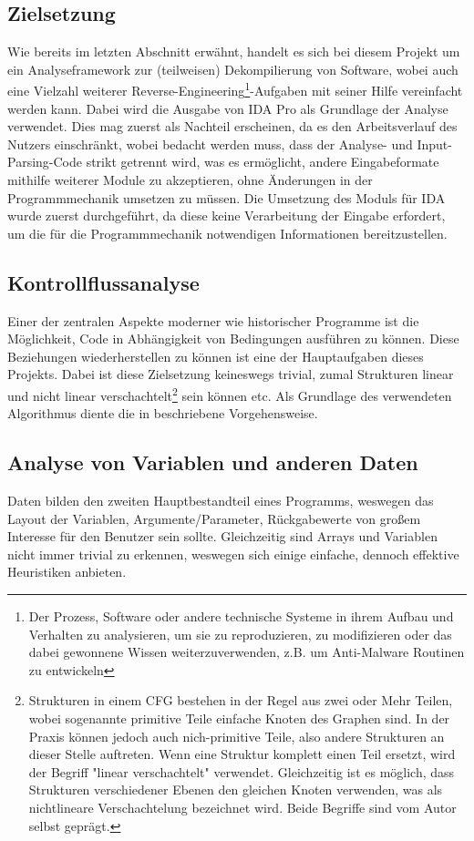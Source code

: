 \documentclass[11pt]{article} %
\begin{document}
\begin{multicols}{2}
\section{Zielsetzung}
Wie bereits im letzten Abschnitt erwähnt, handelt es sich bei diesem Projekt um ein Analyseframework zur (teilweisen) Dekompilierung von Software, wobei auch eine Vielzahl weiterer Reverse-Engineering\footnote{Der Prozess, Software oder andere technische Systeme in ihrem Aufbau und Verhalten zu analysieren, um sie zu reproduzieren, zu modifizieren oder das dabei gewonnene Wissen weiterzuverwenden, z.B. um Anti-Malware Routinen zu entwickeln}-Aufgaben mit seiner Hilfe vereinfacht werden kann. Dabei wird die Ausgabe von IDA Pro als Grundlage der Analyse verwendet. Dies mag zuerst als Nachteil erscheinen, da es den Arbeitsverlauf des Nutzers einschränkt, wobei bedacht werden muss, dass der Analyse- und Input-Parsing-Code strikt getrennt wird, was es ermöglicht, andere Eingabeformate mithilfe weiterer Module zu akzeptieren, ohne Änderungen in der Programmmechanik umsetzen zu müssen. Die Umsetzung des Moduls für IDA wurde zuerst durchgeführt, da diese keine Verarbeitung der Eingabe erfordert, um die für die Programmmechanik notwendigen Informationen bereitzustellen.

\subsection{Kontrollflussanalyse}
\label{sec:CFA}
Einer der zentralen Aspekte moderner wie historischer Programme ist die Möglichkeit, Code in Abhängigkeit von Bedingungen ausführen zu können. Diese Beziehungen wiederherstellen zu können ist eine der Hauptaufgaben dieses Projekts. Dabei ist diese Zielsetzung keineswegs trivial, zumal Strukturen linear und nicht linear verschachtelt\footnote{Strukturen in einem CFG bestehen in der Regel aus zwei oder Mehr Teilen, wobei sogenannte primitive Teile einfache Knoten des Graphen sind. In der Praxis können jedoch auch nich-primitive Teile, also andere Strukturen an dieser Stelle auftreten. Wenn eine Struktur komplett einen Teil ersetzt, wird der Begriff "linear verschachtelt" verwendet. Gleichzeitig ist es möglich, dass Strukturen verschiedener Ebenen den gleichen Knoten verwenden, was als nichtlineare Verschachtelung bezeichnet wird. Beide Begriffe sind vom Autor selbst geprägt.} sein können etc. Als Grundlage des verwendeten Algorithmus diente die in \cite{structural_analysis:1} beschriebene Vorgehensweise.

\subsection{Analyse von Variablen und anderen Daten}
Daten bilden den zweiten Hauptbestandteil eines Programms, weswegen das Layout der Variablen, Argumente/Parameter, Rückgabewerte von großem Interesse für den Benutzer sein sollte. Gleichzeitig sind Arrays und Variablen nicht immer trivial zu erkennen, weswegen sich einige einfache, dennoch effektive Heuristiken anbieten.


\end{multicols}
\end{document}
